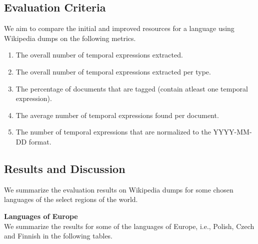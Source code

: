 \subsection{Evaluation Criteria}
We aim to compare the initial and improved resources for a language using Wikipedia dumps on the following metrics. 

\begin{enumerate}[1.]	
	\item The overall number of temporal expressions extracted.
	\item The overall number of temporal expressions extracted per type.
	\item The percentage of documents that are tagged (contain atleast one temporal expression).
	\item The average number of temporal expressions found per document.
	\item The number of temporal expressions that are normalized to the YYYY-MM-DD format.
\end{enumerate}

\subsection{Results and Discussion}
We summarize the evaluation results on Wikipedia dumps for some chosen languages of the select regions of the world. 

\textbf{Languages of Europe}\\
We summarize the results for some of the languages of Europe, i.e., Polish, Czech and Finnish in the following tables.

